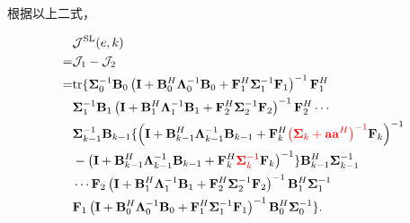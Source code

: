 \documentclass[a4paper,11pt]{article}
\newcommand\V[1]{\mathrm{\bf{#1}}}
\newcommand\Tx[1]{\mathrm{#1}}
\newcommand\Se[1]{\mathcal{#1}}
\newcommand\SB[1]{\left(#1\right)}
\begin{document}
根据以上二式，

\begin{equation}
\begin{split}
&\Se{J}^{\Tx{SL}}(e,k)\\
=&\Se{J}_1-\Se{J}_2\\
=&\Tx{tr}\{\bm{\Sigma}_{0}^{-1}\V{B}_{0}\SB{\V{I}+\V{B}_{0}^H\bm{\Lambda}_0^{-1}\V{B}_{0}+\V{F}_{1}^H\bm{\Sigma}_{1}^{-1}\V{F}_{1}}^{-1}\V{F}_{1}^H\\
&\bm{\Sigma}_{1}^{-1}\V{B}_{1}\SB{\V{I}+\V{B}_{1}^H\bm{\Lambda}_{1}^{-1}\V{B}_{1}+\V{F}_{2}^H\bm{\Sigma}_{2}^{-1}\V{F}_{2}}^{-1}\V{F}_{2}^H\cdots\\
&\bm{\Sigma}_{k-1}^{-1}\V{B}_{k-1}\{\SB{\V{I}+\V{B}_{k-1}^H\bm{\Lambda}_{k-1}^{-1}\V{B}_{k-1}+\V{F}_{k}^H\textcolor{red}{\SB{\bm{\Sigma}_{k}+\V{a}\V{a}^H}^{-1}}\V{F}_{k}}^{-1}\\
&-\SB{\V{I}+\V{B}_{k-1}^H\bm{\Lambda}_{k-1}^{-1}\V{B}_{k-1}+\V{F}_{k}^H\textcolor{red}{\bm{\Sigma}_{k}^{-1}}\V{F}_{k}}^{-1}\}\V{B}_{k-1}^H\bm{\Sigma}_{k-1}^{-1}\\
&\cdots \V{F}_{2}\SB{\V{I}+\V{B}_{1}^H\bm{\Lambda}_{1}^{-1}\V{B}_{1}+\V{F}_{2}^H\bm{\Sigma}_{2}^{-1}\V{F}_{2}}^{-1}\V{B}_{1}^H\bm{\Sigma}_{1}^{-1}\\
&\V{F}_{1}\SB{\V{I}+\V{B}_{0}^H\bm{\Lambda}_0^{-1}\V{B}_{0}+\V{F}_{1}^H\bm{\Sigma}_{1}^{-1}\V{F}_{1}}^{-1}\V{B}_{0}^H\bm{\Sigma}_{0}^{-1}\}.\\
\end{split}
\label{JSL}
\end{equation}
\end{document}
